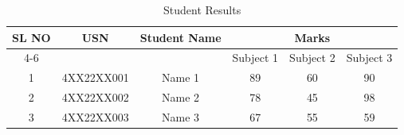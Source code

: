 \documentclass{article}
\begin{document}
\begin{table}[h]

\centering
\caption{Student Results}

\label{tab:results}


\begin{tabular}{|c|c|c|c|c|c|}
\hline
\multirow{2}{*}{SL NO} & \multirow{2}{*}{USN} & 
\multirow{2}{*}{Student Name} & \multicolumn{3}{c|}{Marks} \\

\cline{4-6} & & & Subject 1 & Subject 2 & Subject 3 \\

\hline
1 & 4XX22XX001 & Name 1 & 89 & 60 & 90 \\

\hline
2 & 4XX22XX002 & Name 2 & 78 & 45 & 98 \\

\hline
3 & 4XX22XX003 & Name 3 & 67 & 55 & 59 \\

\hline
\end{tabular}

\end{table}
\end{document}

